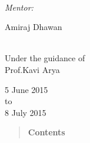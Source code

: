 \documentclass[report]{res}
\begin{document}
\begin{titlepage}
\begin{minipage}{0.4\textwidth}
		\end{minipage}
		~
		\begin{minipage}{0.4\textwidth}
			
			\begin{flushright} \large
				\emph{Mentor:} \\
			\end{flushright}
			
			\begin{flushright}
				{\large Amiraj Dhawan\\} 
			\end{flushright}
		
		\end{minipage}\\[2cm]
		
		{ Under the guidance of\\ \large{ Prof.Kavi Arya\\[3cm]}} %
		
		
		{\large 5 June 2015  \\ to \\ 8 July 2015}\\[3cm] %
		
		
		
		
		\vfill %
		
	\end{titlepage}

	\begin{quote}
		\centering \textbf{\Huge Contents}
	\end{quote}
	\qquad \\ \\
	
\end{document}
